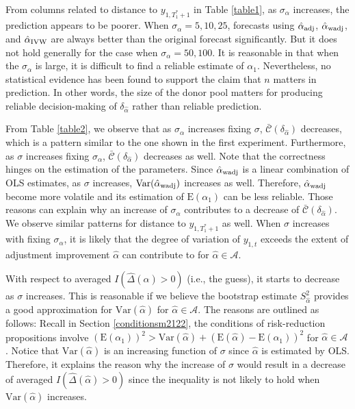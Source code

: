 \documentclass[11pt]{article}
\def\mc#1{\mathcal{#1}} %
\def\E#1{\mathrm{E}(#1)} %
\def\var#1{\mathrm{Var}(#1)} %
\theoremstyle{definition}
\begin{document}
From columns related to distance to $y_{1, T_1^*+1}$ in Table \ref{table1}, as $\sigma_{\alpha}$ increases, the prediction appears to be poorer. When $\sigma_{\alpha}= 5, 10, 25$, forecasts using $\hat{\alpha}_{\rm adj}$, $\hat{\alpha}_{\rm wadj}$, and $\hat{\alpha}_{\rm IVW}$ are always better than the original forecast significantly. But it does not hold generally for the case when $\sigma_{\alpha}=50, 100$. It is reasonable in that when the $\sigma_{\alpha}$ is large, it is difficult to find a reliable estimate of $\alpha_1$.  Nevertheless, no statistical evidence has been found to support the claim that $n$ matters in prediction. In other words, the size of the donor pool matters for producing reliable decision-making of $\delta_{\hat{\alpha}}$ rather than reliable prediction. 






From Table \ref{table2}, we observe that as $\sigma_{\alpha}$ increases fixing $\sigma$, $\bar{\mc{C}}(\delta_{\hat{\alpha}})$   decreases, which is a pattern similar to the one shown in the first experiment. Furthermore, as $\sigma$ increases fixing $\sigma_{\alpha}$, $\bar{\mc{C}}(\delta_{\hat{\alpha}})$ decreases as well. Note that the correctness  hinges on the estimation of the parameters. Since $\hat{\alpha}_{\rm wadj}$  is a linear combination of OLS estimates, as $\sigma$ increases, $\var{\hat{\alpha}_{\rm wadj}}$ increases as well. Therefore, $\hat{\alpha}_{\rm wadj}$ become more volatile and its estimation of $\E{\alpha_1}$ can be less reliable. Those reasons can explain  why an increase of $\sigma_{\alpha}$ contributes to a decrease of  $\bar{\mc{C}}(\delta_{\hat{\alpha}})$.  We observe similar patterns for distance to $y_{1, T_1^*+1}$ as well. When $\sigma$ increases with fixing $\sigma_{\alpha}$, it is likely that the degree of variation of $y_{1,t}$ exceeds the extent of adjustment improvement $\hat{\alpha}$ can contribute to for $\hat{\alpha}\in \mc{A}$.




With respect to averaged $I(\hat{\Delta}(\hat{\alpha})>0)$ (i.e., the guess), it starts to decrease as $\sigma$ increases. This is reasonable if we believe the bootstrap estimate $S^2_{\hat{\alpha}}$ provides a good approximation for $\var{\hat{\alpha}}$ for $\hat{\alpha}\in \mc{A}$. The reasons are outlined as follows: Recall in Section \ref{conditionsm2122}, the conditions of risk-reduction propositions involve $(\E{\alpha_1})^2 > \var{\hat{\alpha}} + (\E{\hat{\alpha}}-\E{\alpha_1})^2$ for $\hat{\alpha}\in \mc{A}$. Notice that $\var{\hat{\alpha}}$ is an increasing function of $\sigma$ since $\hat{\alpha}$ is estimated by OLS. Therefore, it explains the reason why the increase of $\sigma$ would result in a decrease of averaged $I(\hat{\Delta}(\hat{\alpha})>0)$ since the inequality is not likely to hold when  $\var{\hat{\alpha}}$ increases.
\end{document}
